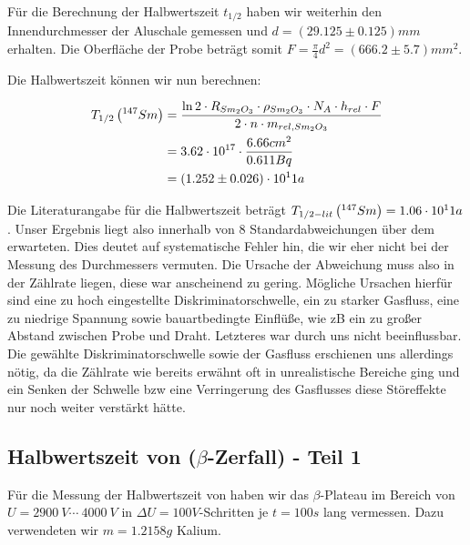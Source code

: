 Für die Berechnung der Halbwertszeit $t_{1/2}$ haben wir weiterhin den Innendurchmesser der Aluschale gemessen und $d = (29.125 \pm 0.125) mm$ erhalten. Die Oberfläche der Probe beträgt somit $F = \frac{\pi}{4} d^2 = (666.2 \pm 5.7) mm^2$.

Die Halbwertszeit können wir nun berechnen:

\begin{align}
 T_{1/2} \left( ^{147}_{}{Sm} \right) &= \frac{\ln 2 \cdot R_{Sm_2O_3} \cdot \rho_{Sm_2O_3} \cdot N_A \cdot h_{rel} \cdot F}{2 \cdot n \cdot m_{rel,Sm_2O_3}} \\
 & = 3.62\cdot 10^{17} \cdot \frac{6.66cm^2}{0.611 Bq} \\
 & = (1.252 \pm 0.026) \cdot 10^11 a
\end{align}

Die Literaturangabe für die Halbwertszeit beträgt $T_{1/2 - lit} \left( ^{147}_{}{Sm} \right) = 1.06 \cdot 10^11 a$. Unser Ergebnis liegt also innerhalb von 8 Standardabweichungen über dem erwarteten. Dies deutet auf systematische Fehler hin, die wir eher nicht bei der Messung des Durchmessers vermuten. Die Ursache der Abweichung muss also in der Zählrate liegen, diese war anscheinend zu gering. Mögliche Ursachen hierfür sind eine zu hoch eingestellte Diskriminatorschwelle, ein zu starker Gasfluss, eine zu niedrige Spannung sowie bauartbedingte Einflüße, wie zB ein zu großer Abstand zwischen Probe und Draht. Letzteres war durch uns nicht beeinflussbar. Die gewählte Diskriminatorschwelle sowie der Gasfluss erschienen uns allerdings nötig, da die Zählrate wie bereits erwähnt oft in unrealistische Bereiche ging und ein Senken der Schwelle bzw eine Verringerung des Gasflusses diese Störeffekte nur noch weiter verstärkt hätte.  

\subsection{Halbwertszeit von  ($\beta$-Zerfall) - Teil 1}

Für die Messung der Halbwertszeit von  haben wir das $\beta$-Plateau im Bereich von $U = 2900\ V \cdots\ 4000\ V$ in $\Delta U = 100 V$-Schritten je $t=100s$ lang vermessen. Dazu verwendeten wir $m=1.2158g$ Kalium.


